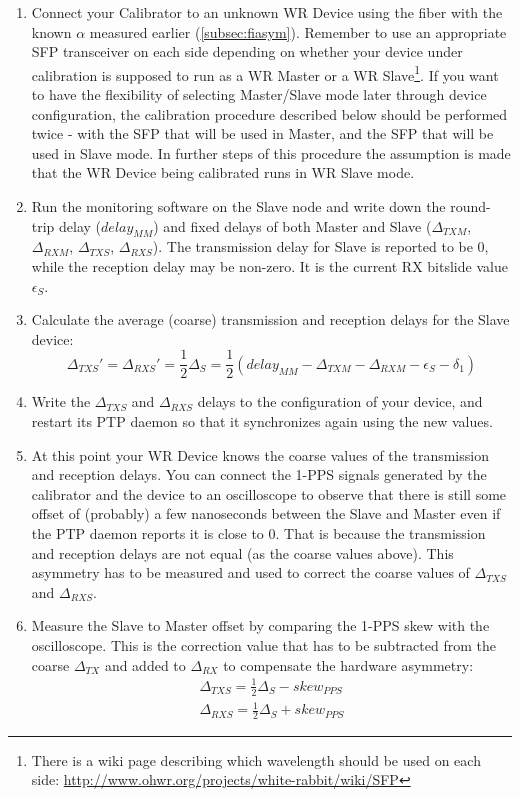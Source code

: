 \begin{enumerate}
	\item Connect your Calibrator to an unknown WR Device using the fiber with the
		known $\alpha$ measured earlier (\ref{subsec:fiasym}). Remember to use an
		appropriate SFP transceiver on each side depending on whether your device
		under calibration is supposed to run as a WR Master or a WR
		Slave\footnote{There is a wiki page describing which wavelength should be
		used on each side: \url{http://www.ohwr.org/projects/white-rabbit/wiki/SFP}}.
		If you want to have the flexibility of selecting Master/Slave mode later
		through device configuration, the calibration procedure described below
		should be performed twice - with the SFP that will be used in Master, and
		the SFP that will be used in Slave mode. In further steps of this procedure
		the assumption is made that the WR Device being calibrated runs in WR Slave
		mode.
	\item Run the monitoring software on the Slave node and write down the
		round-trip delay ($delay_{MM}$) and fixed delays of both Master and Slave
		($\Delta_{TXM}$, $\Delta_{RXM}$, $\Delta_{TXS}$, $\Delta_{RXS}$). The
		transmission delay for Slave is reported to be 0, while the reception delay
		may be non-zero. It is the current RX bitslide value $\epsilon_S$.
	\item Calculate the average (coarse) transmission and reception delays for the
		Slave device:
		\begin{equation}
			\label{equ:devices:coarsedtxrx}
			\Delta_{TXS}' = \Delta_{RXS}' = \frac{1}{2} \Delta_S = 
			\frac{1}{2}(delay_{MM} - \Delta_{TXM} - \Delta_{RXM} - 
			\epsilon_S - \delta_1)
		\end{equation}
	\item Write the $\Delta_{TXS}$ and $\Delta_{RXS}$ delays to the configuration
		of your device, and restart its PTP daemon so that it synchronizes again
		using the new values.
	\item At this point your WR Device knows the coarse values of the transmission
		and reception delays. You can connect the 1-PPS signals generated by the
		calibrator and the device to an oscilloscope to observe that there is still
		some offset of (probably) a few nanoseconds between the Slave and Master
		even if the PTP daemon reports it is close to 0. That is because the
		transmission and reception delays are not equal (as the coarse values
		above). This asymmetry has to be measured and used to correct the coarse
		values of $\Delta_{TXS}$ and $\Delta_{RXS}$.
	\item Measure the Slave to Master offset by comparing the 1-PPS skew with the
		oscilloscope. This is the correction value that has to be subtracted from
		the coarse $\Delta_{TX}$ and added to $\Delta_{RX}$ to compensate the
		hardware asymmetry:
		\begin{align}
			\Delta_{TXS} = \frac{1}{2}\Delta_S - skew_{PPS} \\
			\Delta_{RXS} = \frac{1}{2}\Delta_S + skew_{PPS}
		\end{align}


\end{enumerate}
